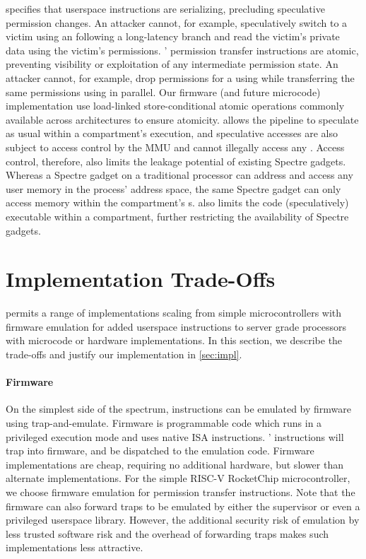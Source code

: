 \seccells specifies that userspace instructions are serializing, 
precluding speculative permission changes.
An attacker cannot, for example, speculatively switch to a victim
\secdiv using an \sdswitch following a long-latency branch and read 
the victim's private data using the victim's permissions.
\seccells' permission transfer instructions are atomic, preventing visibility 
or exploitation of any intermediate permission state.
An attacker \secdiv cannot, for example, drop permissions for a \cell
using \scprot while transferring the same permissions using \sctfer in parallel.
Our firmware (and future microcode) implementation use load-linked 
store-conditional atomic operations commonly available across architectures
to ensure atomicity.
\seccells allows the pipeline to speculate as usual within a compartment's 
execution, and speculative accesses are also subject to access control 
by the MMU and cannot illegally access any \cell.
Access control, therefore, also limits the leakage potential of existing
Spectre gadgets.
Whereas a Spectre gadget on a traditional processor can address and
access any user memory in the process' address space, the same Spectre
gadget can only access memory within the compartment's \cell{}s.
\seccells also limits the code (speculatively) executable within a compartment,
further restricting the availability of Spectre gadgets.

\section{\seccells Implementation Trade-Offs}
\label{app:impl_options}

\seccells permits a range of implementations scaling from simple 
microcontrollers with firmware emulation for added userspace
instructions to server grade processors with microcode or hardware 
implementations. In this section, we describe the trade-offs and 
justify our implementation in \autoref{sec:impl}.

\paragraph{Firmware}
On the simplest side of the spectrum, instructions can be emulated
by firmware using trap-and-emulate.
Firmware is programmable code which runs in a privileged execution mode 
and uses native ISA instructions.
\seccells' instructions will trap into firmware, and be dispatched to 
the emulation code.
Firmware implementations are cheap, requiring no additional hardware, but 
slower than alternate implementations.
For the simple RISC-V RocketChip microcontroller, we choose 
firmware emulation for permission transfer instructions.
Note that the firmware can also forward traps to be emulated by
either the supervisor or even a privileged userspace library.
However, the additional security risk of emulation by less trusted
software risk and the overhead of forwarding traps makes such
implementations less attractive.

